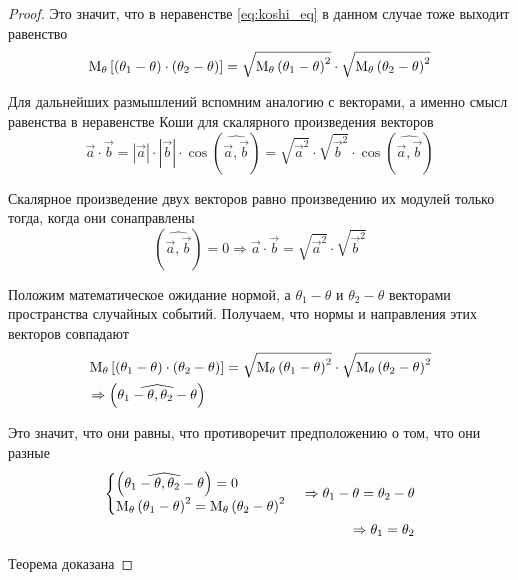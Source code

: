 \begin{proof}
  Это значит, что в неравенстве \eqref{eq:koshi_eq}
  в данном случае тоже выходит равенство
  $$\operatorname{M}_{\theta} \left[ \left( \theta_1-\theta \right)
      \cdot\left( \theta_2-\theta \right) \right]
    =\sqrt{\operatorname{M}_{\theta} \left( \theta_1-\theta \right)^2}
      \cdot\sqrt{\operatorname{M}_{\theta} \left( \theta_2-\theta \right)^2}$$

  Для дальнейших размышлений вспомним аналогию с векторами,
  а именно смысл равенства в неравенстве Коши
  для скалярного произведения векторов
  $$\vec{a}\cdot\vec{b}
    =\left|\vec{a}\right|\cdot\left|\vec{b}\right|
      \cdot\cos{\left(\widehat{\vec{a},\vec{b}}\right)}
    =\sqrt{\vec{a}^2}\cdot\sqrt{\vec{b}^2}
      \cdot\cos{\left(\widehat{\vec{a},\vec{b}}\right)}$$

  Скалярное произведение двух векторов равно произведению их модулей
  только тогда, когда они сонаправлены
  $$\left(\widehat{\vec{a},\vec{b}}\right)=0
    \Rightarrow \vec{a}\cdot\vec{b}
    =\sqrt{\vec{a}^2}\cdot\sqrt{\vec{b}^2}$$

  Положим математическое ожидание нормой,
  а $\theta_1-\theta$ и $\theta_2-\theta$ векторами
  пространства случайных событий.
  Получаем, что нормы и направления этих векторов совпадают
  \begin{align*}
    &\operatorname{M}_{\theta} \left[ \left( \theta_1-\theta \right)
      \cdot\left( \theta_2-\theta \right) \right]
    =\sqrt{\operatorname{M}_{\theta} \left( \theta_1-\theta \right)^2}
      \cdot\sqrt{\operatorname{M}_{\theta} \left( \theta_2-\theta \right)^2}\\
    &\Rightarrow\left(\widehat{\theta_1-\theta,\theta_2-\theta}\right)\\
    \end{align*}

  Это значит, что они равны,
  что противоречит предположению о том, что они разные
  \begin{align*}
    \begin{cases}
      \left(\widehat{\theta_1-\theta,\theta_2-\theta}\right)=0\\
      \operatorname{M}_{\theta} \left( \theta_1-\theta \right)^2
        =\operatorname{M}_{\theta} \left( \theta_2-\theta \right)^2
    \end{cases}
    \Rightarrow \theta_1-\theta=\theta_2-\theta\\
    \Rightarrow\theta_1=\theta_2
  \end{align*}

  Теорема доказана
\end{proof}

